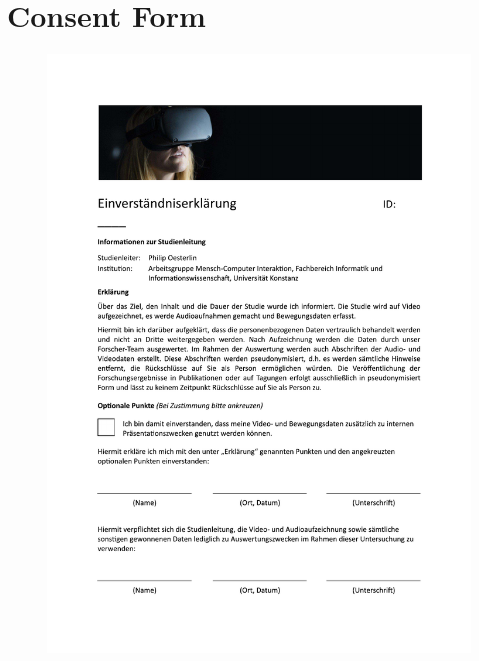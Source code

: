 \section{Consent Form}
\begin{figure}[!h]
\centering
\includegraphics[width=\textwidth]{figures/Appendix/consent form.pdf}
\end{figure}


